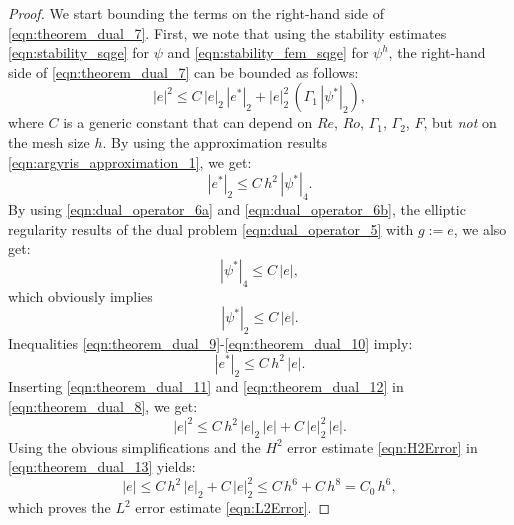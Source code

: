 \begin{proof}
  We start bounding the terms on the right-hand side of
  \eqref{eqn:theorem_dual_7}.  First, we note that using the stability estimates
  \eqref{eqn:stability_sqge} for $\psi$ and \eqref{eqn:stability_fem_sqge} for
  $\psi^h$, the right-hand side of \eqref{eqn:theorem_dual_7} can be bounded as
  follows:
  \begin{equation}
    |e|^2 \leq C \, | e |_2 \, |e^* |_2 + | e |_2^2 \,
      \left( \Gamma_1 \, | \psi^* |_2 \right) ,
    \label{eqn:theorem_dual_8}
  \end{equation}
  where $C$ is a generic constant that can depend on $Re$, $Ro$, $\Gamma_1$,
  $\Gamma_2$, $F$, but \emph{not} on the mesh size $h$.  By using the
  approximation results \eqref{eqn:argyris_approximation_1}, we get:
  \begin{equation}
    |e^* |_2 \leq C \, h^2 \, | \psi^* |_4 .
    \label{eqn:theorem_dual_9}
  \end{equation}
  By using \eqref{eqn:dual_operator_6a} and \eqref{eqn:dual_operator_6b}, the
  elliptic regularity results of the dual problem \eqref{eqn:dual_operator_5}
  with $g := e$, we also get:
  \begin{equation}
    | \psi^* |_4 \leq C \, | e | ,
    \label{eqn:theorem_dual_10}
  \end{equation}
  which obviously implies
  \begin{equation}
    | \psi^* |_2 \leq C \, | e | .
    \label{eqn:theorem_dual_11}
  \end{equation}
  Inequalities \eqref{eqn:theorem_dual_9}-\eqref{eqn:theorem_dual_10} imply:
  \begin{equation}
    |e^* |_2 \leq C \, h^2 \, | e | .
    \label{eqn:theorem_dual_12}
  \end{equation}
  Inserting \eqref{eqn:theorem_dual_11} and \eqref{eqn:theorem_dual_12}  in
  \eqref{eqn:theorem_dual_8}, we get:
  \begin{equation}
    |e|^2 \leq C \, h^2 \, | e |_2 \, | e | + C \, | e |_2^2 \, | e | .
    \label{eqn:theorem_dual_13}
  \end{equation}
  Using the obvious simplifications and the $H^2$ error estimate
  \eqref{eqn:H2Error} in \eqref{eqn:theorem_dual_13} yields:
  \begin{equation}
    |e| \leq C \, h^2 \, | e |_2 + C \, | e |_2^2 \leq C \, h^6 + C \, h^8
      = C_0 \, h^6 ,
    \label{eqn:theorem_dual_14}
  \end{equation}
  which proves the $L^2$ error estimate \eqref{eqn:L2Error}.


\end{proof}
